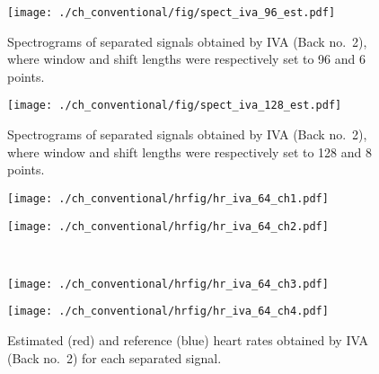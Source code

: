 \begin{figure}[tb]
\centering
\texttt{[image: ./ch\_conventional/fig/spect\_iva\_96\_est.pdf]}
\caption{Spectrograms of separated signals obtained by IVA (Back no.~2), where window and shift lengths were respectively set to 96 and 6 points.}
\label{fig:siva96est}
\end{figure}

\begin{figure}[tb]
\centering
\texttt{[image: ./ch\_conventional/fig/spect\_iva\_128\_est.pdf]}
\caption{Spectrograms of separated signals obtained by IVA (Back no.~2), where window and shift lengths were respectively set to 128 and 8 points.}
\label{fig:siva128est}
\end{figure}

\begin{figure}[htbp]
     \begin{minipage}[t]{0.45\hsize}
        \centering
        \texttt{[image: ./ch\_conventional/hrfig/hr\_iva\_64\_ch1.pdf]}
        \label{fig:hriva32ch1}
      \end{minipage} 
      \begin{minipage}[t]{0.45\hsize}
        \centering
        \texttt{[image: ./ch\_conventional/hrfig/hr\_iva\_64\_ch2.pdf]}
        \label{fig:hriva32ch2}
      \end{minipage} \\
      \begin{minipage}[t]{0.45\hsize}
        \centering
        \texttt{[image: ./ch\_conventional/hrfig/hr\_iva\_64\_ch3.pdf]}
        \label{fig:hriva32ch3}
      \end{minipage} 
      \begin{minipage}[t]{0.45\hsize}
        \centering
        \texttt{[image: ./ch\_conventional/hrfig/hr\_iva\_64\_ch4.pdf]}
        \label{fig:hriva32ch4}
      \end{minipage} 
     \caption{Estimated (red) and reference (blue) heart rates obtained by IVA (Back no.~2) for each separated signal.}
     \label{fig:hriva}
  \end{figure}

